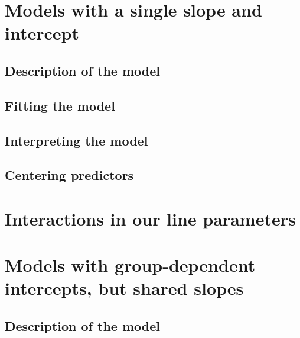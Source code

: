 \documentclass[
]{book}
\begin{document}
\hypertarget{models-with-a-single-slope-and-intercept}{%
\section{Models with a single slope and intercept}\label{models-with-a-single-slope-and-intercept}}

\hypertarget{description-of-the-model-4}{%
\subsection{Description of the model}\label{description-of-the-model-4}}

\hypertarget{fitting-the-model-3}{%
\subsection{Fitting the model}\label{fitting-the-model-3}}

\hypertarget{interpreting-the-model-2}{%
\subsection{Interpreting the model}\label{interpreting-the-model-2}}

\hypertarget{centering-predictors}{%
\subsection{Centering predictors}\label{centering-predictors}}

\hypertarget{interactions-in-our-line-parameters}{%
\section{Interactions in our line parameters}\label{interactions-in-our-line-parameters}}

\hypertarget{models-with-group-dependent-intercepts-but-shared-slopes}{%
\section{Models with group-dependent intercepts, but shared slopes}\label{models-with-group-dependent-intercepts-but-shared-slopes}}

\hypertarget{description-of-the-model-5}{%
\subsection{Description of the model}\label{description-of-the-model-5}}
\end{document}
